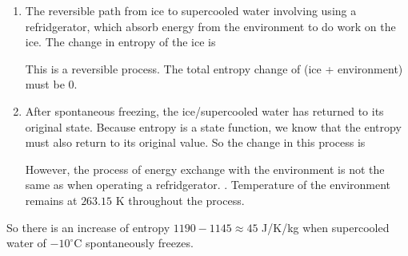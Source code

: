 \documentclass[class=article, crop=false, 12pt]{standalone}
\begin{document}
\begin{example}
    \begin{enumerate}
        \item The reversible path from ice to supercooled water involving using a refridgerator, 
        which absorb energy from the environment to do work on the ice.
        The change in entropy of the ice is
        
        This is a reversible process.
        The total entropy change of (ice + environment) must be $0$.
        
        \item After spontaneous freezing, 
        the ice/supercooled water has returned to its original state.
        Because entropy is a state function, 
        we know that the entropy must also return to its original value. 
        So the change in this process is

        However, the process of energy exchange with the environment is not the same as when operating a refridgerator. 
        . 
        Temperature of the environment remains at $263.15$ K throughout the process. 
    \end{enumerate}

    So there is an increase of entropy $1190-1145 \approx 45$ J/K/kg 
    when supercooled water of $-10^\circ$C spontaneously freezes.

\end{example}

\theend
\end{document}
